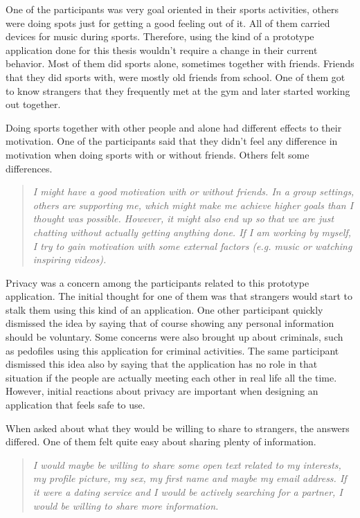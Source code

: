 One of the participants was very goal oriented in their sports activities, others were doing spots just for getting a good feeling out of it. All of them carried devices for music during sports. Therefore, using the kind of a prototype application done for this thesis wouldn't require a change in their current behavior. Most of them did sports alone, sometimes together with friends. Friends that they did sports with, were mostly old friends from school. One of them got to know strangers that they frequently met at the gym and later started working out together.

Doing sports together with other people and alone had different effects to their motivation. One of the participants said that they didn't feel any difference in motivation when doing sports with or without friends. Others felt some differences.

\begin{quotation}
\it I might have a good motivation with or without friends. In a group settings, others are supporting me, which might make me achieve higher goals than I thought was possible. However, it might also end up so that we are just chatting without actually getting anything done. If I am working by myself, I try to gain motivation with some external factors (e.g. music or watching inspiring videos).
\end{quotation}

Privacy was a concern among the participants related to this prototype application. The initial thought for one of them was that strangers would start to stalk them using this kind of an application. One other participant quickly dismissed the idea by saying that of course showing any personal information should be voluntary. Some concerns were also brought up about criminals, such as pedofiles using this application for criminal activities. The same participant dismissed this idea also by saying that the application has no role in that situation if the people are actually meeting each other in real life all the time. However, initial reactions about privacy are important when designing an application that feels safe to use.

When asked about what they would be willing to share to strangers, the answers differed. One of them felt quite easy about sharing plenty of information.

\begin{quotation}
\it I would maybe be willing to share some open text related to my interests, my profile picture, my sex, my first name and maybe my email address. If it were a dating service and I would be actively searching for a partner, I would be willing to share more information.
\end{quotation}

